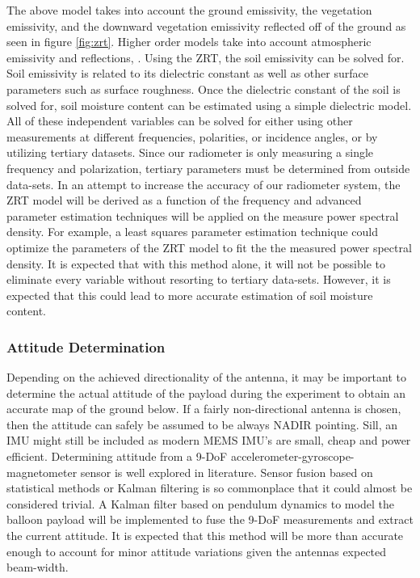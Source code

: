 \documentclass[12pt]{article}
\begin{document}
\begin{enumerate}
The above model takes into account the ground emissivity, the vegetation emissivity, and the downward vegetation emissivity reflected off of the ground as seen in figure \ref{fig:zrt}. Higher order models take into account atmospheric emissivity and reflections, . Using the ZRT, the soil emissivity can be solved for. Soil emissivity is related to its dielectric constant as well as other surface parameters such as surface roughness. Once the dielectric constant of the soil is solved for, soil moisture content can be estimated using a simple dielectric model. All of these independent variables can be solved for either using other measurements at different frequencies, polarities, or incidence angles, or by utilizing tertiary datasets. Since our radiometer is only measuring a single frequency and polarization, tertiary parameters must be determined from outside data-sets. In an attempt to increase the accuracy of our radiometer system, the ZRT model will be derived as a function of the frequency and advanced parameter estimation techniques will be applied on the measure power spectral density. For example, a least squares parameter estimation technique could optimize the parameters of the ZRT model to fit the the measured power spectral density. It is expected that with this method alone, it will not be possible to eliminate every variable without resorting to tertiary data-sets. However, it is expected that this could lead to more accurate estimation of soil moisture content.
\end{enumerate}

\subsubsection{Attitude Determination}

Depending on the achieved directionality of the antenna, it may be important to determine the actual attitude of the payload during the experiment to obtain an accurate map of the ground below. If a fairly non-directional antenna is chosen, then the attitude can safely be assumed to be always NADIR pointing. Sill, an IMU might still be included as modern MEMS IMU's are small, cheap and power efficient. Determining attitude from a 9-DoF accelerometer-gyroscope-magnetometer sensor is well explored in literature. Sensor fusion based on statistical methods or Kalman filtering is so commonplace that it could almost be considered trivial. A Kalman filter based on pendulum dynamics to model the balloon payload will be implemented to fuse the 9-DoF measurements and extract the current attitude. It is expected that this method will be more than accurate enough to account for minor attitude variations given the antennas expected beam-width. \cite{Vujicic2016} \cite{Estimation2017} \cite{Rhudy2017} \cite{Chow} \cite{Wan}
\end{document}
